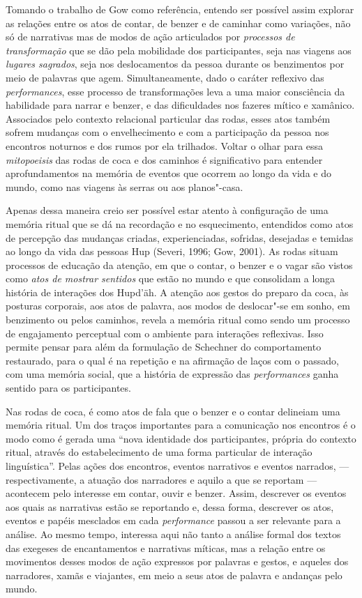 Tomando o trabalho de Gow como referência, entendo ser possível assim
explorar as relações entre os atos de contar, de benzer e de caminhar
como variações, não só de narrativas mas de modos de ação articulados
por \textit{processos de transformação} que se dão pela mobilidade dos
participantes, seja nas viagens aos \textit{lugares sagrados}, seja nos
deslocamentos da pessoa durante os benzimentos por meio de palavras que
agem. Simultaneamente, dado o caráter reflexivo das \textit{performances},
esse processo de transformações leva a uma maior consciência da
habilidade para narrar e benzer, e das dificuldades nos fazeres mítico e
xamânico. Associados pelo contexto relacional particular das rodas,
esses atos também sofrem mudanças com o envelhecimento e com a
participação da pessoa nos encontros noturnos e dos rumos por ela
trilhados. Voltar o olhar para essa \textit{mitopoeisis} das rodas de coca
e dos caminhos é significativo para entender aprofundamentos na memória
de eventos que ocorrem ao longo da vida e do mundo, como nas viagens às
serras ou aos planos"-casa.

Apenas dessa maneira creio ser possível estar atento à configuração de
uma memória ritual que se dá na recordação e no esquecimento, entendidos
como atos de percepção das mudanças criadas, experienciadas, sofridas,
desejadas e temidas ao longo da vida das pessoas Hup (Severi, 1996; Gow,
2001). As rodas situam processos de educação da atenção, em que o
contar, o benzer e o vagar são vistos como \textit{atos de mostrar sentidos}
que estão no mundo e que consolidam a longa história de interações dos
Hupd'äh. A atenção aos gestos do preparo da coca, às posturas corporais,
aos atos de palavra, aos modos de deslocar"-se em sonho, em benzimento ou
pelos caminhos, revela a memória ritual como sendo um processo de
engajamento perceptual com o ambiente para interações reflexivas. Isso
permite pensar para além da formulação de Schechner do comportamento
restaurado, para o qual é na repetição e na afirmação de laços com o
passado, com uma memória social, que a história de expressão das
\textit{performances} ganha sentido para os participantes.

Nas rodas de coca, é como atos de fala que o benzer e o contar delineiam
uma memória ritual. Um dos traços importantes para a comunicação nos
encontros é o modo como é gerada uma ``nova identidade dos
participantes, própria do contexto ritual, através do estabelecimento de
uma forma particular de interação linguística''. Pelas ações dos
encontros, eventos narrativos e eventos narrados, --- respectivamente, a atuação 
dos narradores e aquilo a que se reportam --- acontecem pelo interesse em contar,
ouvir e benzer. Assim, descrever os eventos aos quais as narrativas
estão se reportando e, dessa forma, descrever os atos, eventos e papéis
mesclados em cada \textit{performance} passou a ser relevante para a
análise. Ao mesmo tempo, interessa aqui não tanto a análise formal dos
textos das exegeses de encantamentos e narrativas míticas, mas a relação
entre os movimentos desses modos de ação expressos por palavras e
gestos, e aqueles dos narradores, xamãs e viajantes, em meio a seus atos
de palavra e andanças pelo mundo.

